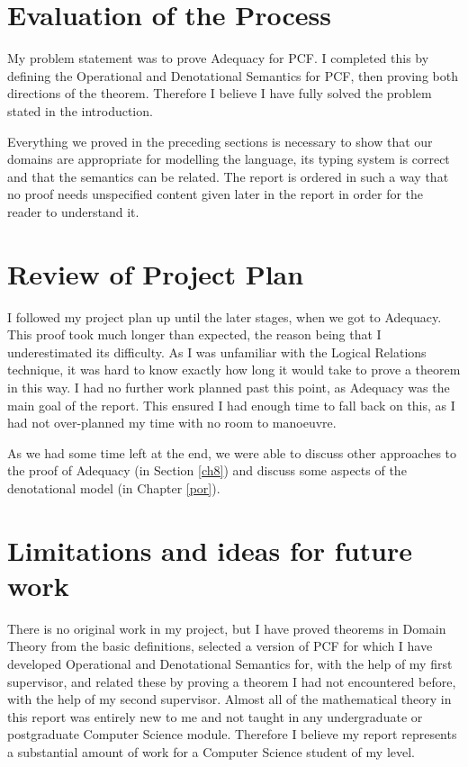 \section{Evaluation of the Process} 
My problem statement was to prove Adequacy for PCF. I completed this by defining the Operational and Denotational Semantics for PCF, then proving both directions of the theorem. Therefore I believe I have fully solved the problem stated in the introduction. 

Everything we proved in the preceding sections is necessary to show that our domains are appropriate for modelling the language, its typing system is correct and that the semantics can be related. The report is ordered in such a way that no proof needs unspecified content given later in the report in order for the reader to understand it. 

\section{Review of Project Plan}
I followed my project plan up until the later stages, when we got to Adequacy. This proof took much longer than expected, the reason being that I underestimated its difficulty. As I was unfamiliar with the Logical Relations technique, it was hard to know exactly how long it would take to prove a theorem in this way. I had no further work planned past this point, as Adequacy was the main goal of the report. This ensured I had enough time to fall back on this, as I had not over-planned my time with no room to manoeuvre. 
 
As we had some time left at the end, we were able to discuss other approaches to the proof of Adequacy (in Section \ref{ch8}) and discuss some  aspects of the denotational model (in Chapter \ref{por}).

\section{Limitations and ideas for future work}
There is no original work in my project, but I have proved theorems in Domain Theory from the basic definitions, selected a version of PCF for which I have developed Operational and Denotational Semantics for, with the help of my first supervisor, and related these by proving a theorem I had not encountered before, with the help of my second supervisor. Almost all of the mathematical theory in this report was entirely new to me and not taught in any undergraduate or postgraduate Computer Science module. Therefore I believe my report represents a substantial amount of work for a Computer Science student of my level.   

